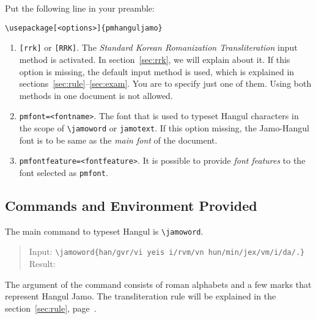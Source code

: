 \documentclass[a4paper]{article}
\providecommand*\textkorean[1]{#1}
\begin{document}
Put the following line in your preamble:
\begin{verbatim}
\usepackage[<options>]{pmhanguljamo}
\end{verbatim}
\begin{enumerate}
\item \texttt{[rrk]} or \texttt{[RRK]}. The \emph{Standard Korean Romanization Transliteration} input method is activated. In section~\ref{sec:rrk},
we will explain about it. If this option is missing, the default input
method is used, which is explained in sections~\ref{sec:rule}--\ref{sec:exam}.
You are to specify just one of them. Using both methods in one document is
not allowed.

\item \texttt{pmfont=<fontname>}. The font that is used to typeset Hangul 
characters in the scope of \verb|\jamoword| or \texttt{jamotext}. If this option missing, the Jamo-Hangul font is to be same as the \textit{main font} of 
the document.

\item \texttt{pmfontfeature=<fontfeature>}. It is possible to provide \emph{font features} to
the font selected as \texttt{pmfont}.
\end{enumerate}

\subsection{Commands and Environment Provided}

The main command to typeset Hangul is \verb|\jamoword|.

\begin{quote}
Input:
\verb|\jamoword{han/gvr/vi yeis i/rvm/vn hun/min/jex/vm/i/da/.}|\\
Result: \textkorean{}
\end{quote}

The argument of the command consists of roman alphabets 
and a few marks that represent Hangul Jamo.
The transliteration rule will be explained in the section~\ref{sec:rule}, page~\pageref{sec:rule}.
\end{document}
